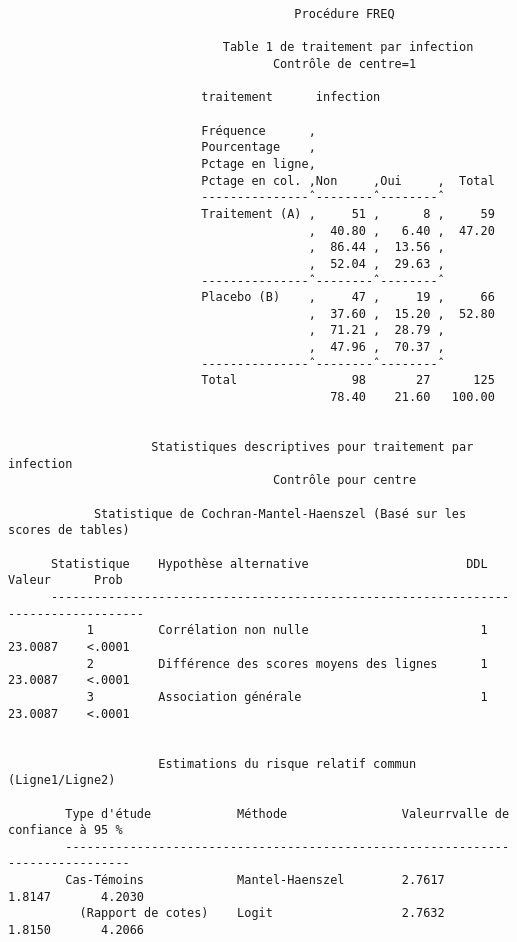 \begin{verbatim}
                                        Procédure FREQ

                              Table 1 de traitement par infection
                                     Contrôle de centre=1

                           traitement      infection

                           Fréquence      ‚
                           Pourcentage    ‚
                           Pctage en ligne‚
                           Pctage en col. ‚Non     ‚Oui     ‚  Total
                           ---------------ˆ--------ˆ--------ˆ
                           Traitement (A) ‚     51 ‚      8 ‚     59
                                          ‚  40.80 ‚   6.40 ‚  47.20
                                          ‚  86.44 ‚  13.56 ‚
                                          ‚  52.04 ‚  29.63 ‚
                           ---------------ˆ--------ˆ--------ˆ
                           Placebo (B)    ‚     47 ‚     19 ‚     66
                                          ‚  37.60 ‚  15.20 ‚  52.80
                                          ‚  71.21 ‚  28.79 ‚
                                          ‚  47.96 ‚  70.37 ‚
                           ---------------ˆ--------ˆ--------ˆ
                           Total                98       27      125
                                             78.40    21.60   100.00


                    Statistiques descriptives pour traitement par infection
                                     Contrôle pour centre

            Statistique de Cochran-Mantel-Haenszel (Basé sur les scores de tables)

      Statistique    Hypothèse alternative                      DDL      Valeur      Prob
      -----------------------------------------------------------------------------------
           1         Corrélation non nulle                        1     23.0087    <.0001
           2         Différence des scores moyens des lignes      1     23.0087    <.0001
           3         Association générale                         1     23.0087    <.0001


                     Estimations du risque relatif commun (Ligne1/Ligne2)

        Type d'étude            Méthode                Valeurrvalle de confiance à 95 %
        -------------------------------------------------------------------------------
        Cas-Témoins             Mantel-Haenszel        2.7617       1.8147       4.2030
          (Rapport de cotes)    Logit                  2.7632       1.8150       4.2066


\end{verbatim}
